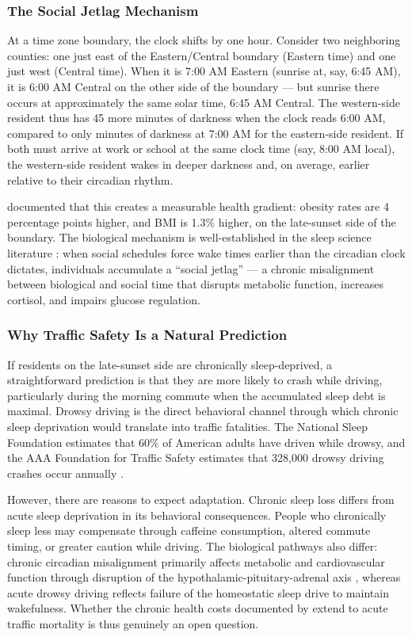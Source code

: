 \documentclass[12pt]{article}
\begin{document}
\subsubsection*{The Social Jetlag Mechanism} At a time zone boundary, the clock shifts by one hour. Consider two neighboring counties: one just east of the Eastern/Central boundary (Eastern time) and one just west (Central time). When it is 7:00 AM Eastern (sunrise at, say, 6:45 AM), it is 6:00 AM Central on the other side of the boundary --- but sunrise there occurs at approximately the same solar time, 6:45 AM Central. The western-side resident thus has 45 more minutes of darkness when the clock reads 6:00 AM, compared to only minutes of darkness at 7:00 AM for the eastern-side resident. If both must arrive at work or school at the same clock time (say, 8:00 AM local), the western-side resident wakes in deeper darkness and, on average, earlier relative to their circadian rhythm.

\citet{giuntella2019sunset} documented that this creates a measurable health gradient: obesity rates are 4 percentage points higher, and BMI is 1.3\% higher, on the late-sunset side of the boundary. The biological mechanism is well-established in the sleep science literature \citep{roenneberg2012social, wittmann2006social}: when social schedules force wake times earlier than the circadian clock dictates, individuals accumulate a ``social jetlag'' --- a chronic misalignment between biological and social time that disrupts metabolic function, increases cortisol, and impairs glucose regulation.

\subsubsection*{Why Traffic Safety Is a Natural Prediction} If residents on the late-sunset side are chronically sleep-deprived, a straightforward prediction is that they are more likely to crash while driving, particularly during the morning commute when the accumulated sleep debt is maximal. Drowsy driving is the direct behavioral channel through which chronic sleep deprivation would translate into traffic fatalities. The National Sleep Foundation estimates that 60\% of American adults have driven while drowsy, and the AAA Foundation for Traffic Safety estimates that 328,000 drowsy driving crashes occur annually \citep{AAA2016drowsy}.

However, there are reasons to expect adaptation. Chronic sleep loss differs from acute sleep deprivation in its behavioral consequences. People who chronically sleep less may compensate through caffeine consumption, altered commute timing, or greater caution while driving. The biological pathways also differ: chronic circadian misalignment primarily affects metabolic and cardiovascular function through disruption of the hypothalamic-pituitary-adrenal axis \citep{borbely1982sleep}, whereas acute drowsy driving reflects failure of the homeostatic sleep drive to maintain wakefulness. Whether the chronic health costs documented by \citet{giuntella2019sunset} extend to acute traffic mortality is thus genuinely an open question.
\end{document}
